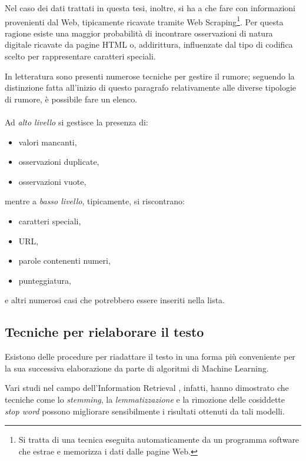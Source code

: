 \documentclass[12pt]{report}
\theoremstyle{definition}
\begin{document}
Nel caso dei dati trattati in questa tesi, inoltre, si ha a che fare con informazioni provenienti dal Web, tipicamente ricavate tramite Web Scraping\footnote{Si tratta di una tecnica eseguita automaticamente da un programma software che estrae e memorizza i dati dalle pagine Web.}. Per questa ragione esiste una maggior probabilità di incontrare osservazioni di natura digitale ricavate da pagine HTML o, addirittura, influenzate dal tipo di codifica scelto per rappresentare caratteri speciali.

In letteratura sono presenti numerose tecniche per gestire il rumore; seguendo la distinzione fatta all'inizio di questo paragrafo relativamente alle diverse tipologie di rumore, è possibile fare un elenco.
\\
\\
Ad \textit{alto livello} si gestisce la presenza di:
\begin{itemize}
    \item valori mancanti,
    \item osservazioni duplicate,
    \item osservazioni vuote,
\end{itemize}

mentre a \textit{basso livello}, tipicamente, si riscontrano:
\begin{itemize}
    \item caratteri speciali,
    \item URL,
    \item parole contenenti numeri,
    \item punteggiatura,
\end{itemize}

e altri numerosi casi che potrebbero essere inseriti nella lista.
\subsection{Tecniche per rielaborare il testo}
Esistono delle procedure per riadattare il testo in una forma più conveniente per la sua successiva elaborazione da parte di algoritmi di Machine Learning.

Vari studi nel campo dell'Information Retrieval \cite{2, 22}, infatti, hanno dimostrato che tecniche come lo \textit{stemming}, la \textit{lemmatizzazione} e la rimozione delle cosiddette \textit{stop word} possono migliorare sensibilmente i risultati ottenuti da tali modelli.
\end{document}
